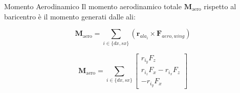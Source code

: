 \documentclass[aspectratio=169]{beamer} %
\begin{document}
\begin{frame}{Momento Aerodinamico}
    Il momento aerodinamico totale $\bm{M}_{\text{aero}}$ rispetto al baricentro è il momento generati dalle ali:
    
    \begin{equation*}
        \bm{M}_{\text{aero}} = \sum_{i \in \{dx, sx\}} (\mathbf{r}_{ala_i} \times \mathbf{F}_{aero, wing})
    \end{equation*}

    \begin{equation}
        \bm{M}_{\text{aero}} = 
        \sum_{i \in \{dx, sx\}} 
        \begin{bmatrix} 
        r_{i_y} F_{z} \\ 
        r_{i_z} F_{x} - r_{i_x} F_{z} \\ 
        -r_{i_y} F_{x} 
        \end{bmatrix}
    \end{equation}
\end{frame}
\end{document}
